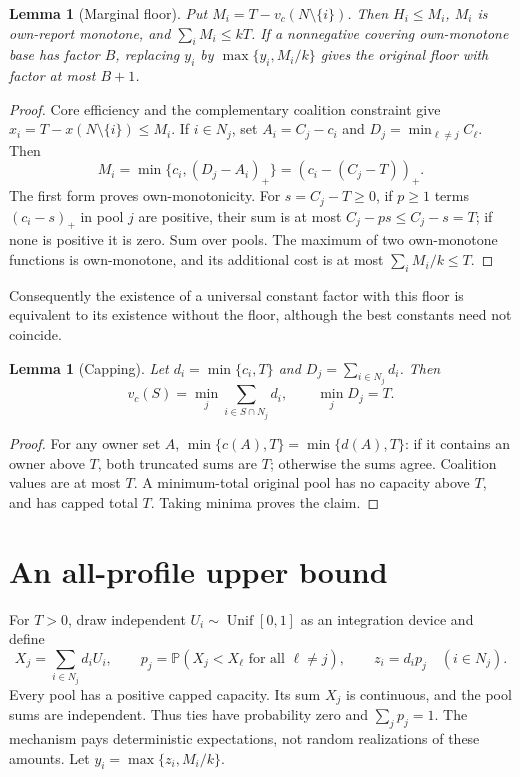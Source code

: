 \documentclass[11pt]{article}
\newtheorem{lemma}[theorem]{Lemma}
\theoremstyle{definition}\newtheorem{definition}[theorem]{Definition}
\theoremstyle{remark}\newtheorem{remark}[theorem]{Remark}
\newcommand{\Prob}{\mathbb P}
\begin{document}
\begin{lemma}[Marginal floor]\label{lem:floor}
Put $M_i=T-v_c(N\setminus\{i\})$. Then $H_i\le M_i$, $M_i$ is own-report
monotone, and $\sum_iM_i\le kT$. If a nonnegative covering own-monotone base
has factor $B$, replacing $y_i$ by $\max\{y_i,M_i/k\}$ gives the original
floor with factor at most $B+1$.
\end{lemma}
\begin{proof}
Core efficiency and the complementary coalition constraint give
$x_i=T-x(N\setminus\{i\})\le M_i$. If $i\in N_j$, set
$A_i=C_j-c_i$ and $D_j=\min_{\ell\ne j}C_\ell$. Then
\[
 M_i=\min\{c_i,(D_j-A_i)_+\}=(c_i-(C_j-T))_+.
\]
The first form proves own-monotonicity. For $s=C_j-T\ge0$, if $p\ge1$
terms $(c_i-s)_+$ in pool $j$ are positive, their sum is at most
$C_j-ps\le C_j-s=T$; if none is positive it is zero. Sum over pools.
The maximum of two own-monotone functions is own-monotone, and its additional
cost is at most $\sum_iM_i/k\le T$.
\end{proof}
Consequently the existence of a universal constant factor with this floor
is equivalent to its existence without the floor, although the best constants
need not coincide.

\begin{lemma}[Capping]\label{lem:cap}
Let $d_i=\min\{c_i,T\}$ and $D_j=\sum_{i\in N_j}d_i$. Then
\[
 v_c(S)=\min_j\sum_{i\in S\cap N_j}d_i,\qquad \min_jD_j=T.
\]
\end{lemma}
\begin{proof}
For any owner set $A$, $\min\{c(A),T\}=\min\{d(A),T\}$: if it contains
an owner above $T$, both truncated sums are $T$; otherwise the sums agree.
Coalition values are at most $T$. A minimum-total original pool has no
capacity above $T$, and has capped total $T$. Taking minima proves the claim.
\end{proof}

\section{An all-profile upper bound}\label{sec:banzhaf}
For $T>0$, draw independent $U_i\sim\operatorname{Unif}[0,1]$ as an
integration device and define
\[
 X_j=\sum_{i\in N_j}d_iU_i,\qquad
 p_j=\Prob(X_j<X_\ell\text{ for all }\ell\ne j),\qquad z_i=d_ip_j
 \quad(i\in N_j).
\]
Every pool has a positive capped capacity. Its sum $X_j$ is continuous, and
the pool sums are independent. Thus ties have probability zero and
$\sum_jp_j=1$. The mechanism pays deterministic expectations, not random
realizations of these amounts. Let $y_i=\max\{z_i,M_i/k\}$.
\end{document}
